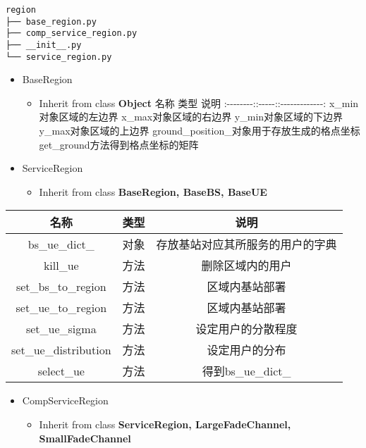 \documentclass[11pt]{article}
\providecommand{\tightlist}{%
      \setlength{\itemsep}{0pt}\setlength{\parskip}{0pt}}
\begin{document}
\begin{verbatim}
region
├── base_region.py
├── comp_service_region.py
├── __init__.py
└── service_region.py
\end{verbatim}

\begin{itemize}
\tightlist
\item
  BaseRegion

  \begin{itemize}
  \tightlist
  \item
    Inherit from class \textbf{Object} \textbar{} 名称 \textbar{} 类型
    \textbar{} 说明 \textbar{}
    \textbar{}:-\/-\/-\/-\/-\/-\/-\/-:\textbar{}:-\/-\/-\/-\/-:\textbar{}:-\/-\/-\/-\/-\/-\/-\/-\/-\/-\/-\/-\/-:\textbar{}
    \textbar{}x\_min\textbar{}对象\textbar{}区域的左边界\textbar{}
    \textbar{}x\_max\textbar{}对象\textbar{}区域的右边界\textbar{}
    \textbar{}y\_min\textbar{}对象\textbar{}区域的下边界\textbar{}
    \textbar{}y\_max\textbar{}对象\textbar{}区域的上边界\textbar{}
    \textbar{}ground\_position\_\textbar{}对象\textbar{}用于存放生成的格点坐标\textbar{}
    \textbar{}get\_ground\textbar{}方法\textbar{}得到格点坐标的矩阵\textbar{}
  \end{itemize}
\item
  ServiceRegion

  \begin{itemize}
  \tightlist
  \item
    Inherit from class \textbf{BaseRegion, BaseBS, BaseUE}
  \end{itemize}
\end{itemize}

\begin{longtable}[c]{@{}ccc@{}}
\toprule
名称 & 类型 & 说明\tabularnewline
\midrule
\endhead
bs\_ue\_dict\_ & 对象 & 存放基站对应其所服务的用户的字典\tabularnewline
kill\_ue & 方法 & 删除区域内的用户\tabularnewline
set\_bs\_to\_region & 方法 & 区域内基站部署\tabularnewline
set\_ue\_to\_region & 方法 & 区域内基站部署\tabularnewline
set\_ue\_sigma & 方法 & 设定用户的分散程度\tabularnewline
set\_ue\_distribution & 方法 & 设定用户的分布\tabularnewline
select\_ue & 方法 & 得到bs\_ue\_dict\_\tabularnewline
\bottomrule
\end{longtable}

\begin{itemize}
\tightlist
\item
  CompServiceRegion

  \begin{itemize}
  \tightlist
  \item
    Inherit from class \textbf{ServiceRegion, LargeFadeChannel,
    SmallFadeChannel}
  \end{itemize}
\end{itemize}
\end{document}
